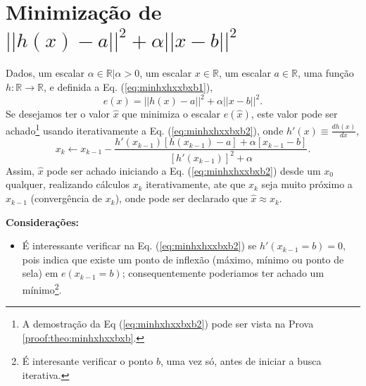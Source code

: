 \section{Minimização de $||h(x)-a||^2+\alpha ||x-b||^2$}


\begin{theorem}\label{theo:minhxhxxbxb}
Dados,
um escalar $\alpha \in \mathbb{R} | \alpha > 0$, 
um escalar $x \in \mathbb{R}$, 
um escalar $a \in \mathbb{R}$,  
uma função $h:\mathbb{R} \rightarrow \mathbb{R}$, e 
definida a Eq. (\ref{eq:minhxhxxbxb1}),
\begin{equation}\label{eq:minhxhxxbxb1}
e(x)=||h(x)-a||^2+\alpha ||x-b||^2.
\end{equation}
Se desejamos ter o valor $\hat{x}$ que minimiza o escalar $e(\hat{x})$,
este valor pode ser achado\footnote{A 
demostração da Eq (\ref{eq:minhxhxxbxb2}) pode ser vista na Prova \ref{proof:theo:minhxhxxbxb}.} 
 usando iterativamente a Eq. (\ref{eq:minhxhxxbxb2}),
onde  $h'(x)\equiv \frac{d h(x)}{d x}$,
\begin{equation}\label{eq:minhxhxxbxb2}
x_{k} \leftarrow x_{k-1}-
\frac{ h'(x_{k-1}) \left[h(x_{k-1})-a\right]+\alpha\left[ x_{k-1}-b\right]}{\left[h'(x_{k-1})\right]^2+\alpha}.
\end{equation}
Assim, $\hat{x}$ pode ser achado iniciando a Eq. (\ref{eq:minhxhxxbxb2}) desde um 
$x_{0}$ qualquer, realizando cálculos $x_{k}$ iterativamente, 
ate que $x_{k}$ seja muito próximo a $x_{k-1}$ (convergência de $x_{k}$),
onde pode ser declarado que $\hat{x} \approx x_{k}$.

\textbf{Considerações:}
\begin{itemize}
\item É interessante verificar na Eq. (\ref{eq:minhxhxxbxb2}) 
se  $h'(x_{k-1}=b) = 0$,
pois indica que existe um ponto de inflexão 
(máximo, mínimo ou ponto de sela) em $e(x_{k-1}=b)$;
consequentemente poderiamos ter achado um mínimo\footnote{É 
interesante verificar o ponto $b$, uma vez só, 
antes de iniciar a busca iterativa.}.
\end{itemize}

\end{theorem}

